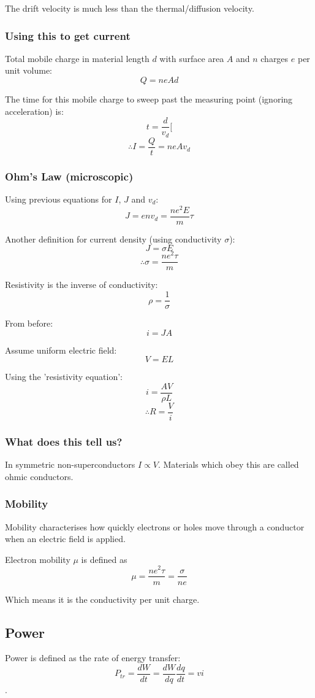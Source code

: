 \documentclass[11pt,a4paper]{report}
\begin{document}
The drift velocity is much less than the thermal/diffusion velocity. 

\subsubsection{Using this to get current}
Total mobile charge in material length $d$ with surface area $A$ and $n$ charges $e$ per unit volume:
\[Q=neAd\]

The time for this mobile charge to sweep past the measuring point (ignoring acceleration) is:
\[t=\frac{d}{v_d}[\]
\[\therefore I = \frac{Q}{t} = neAv_d\]

\subsubsection{Ohm's Law (microscopic)}
Using previous equations for $I$, $J$ and $v_d$:
\[J = env_d=\frac{ne^2E}{m}\tau\]

Another definition for current density (using conductivity $\sigma$):
\[J=\sigma E\]
\[\therefore \sigma = \frac{ne^2\tau}{m}\]

Resistivity is the inverse of conductivity:
\[\rho = \frac{1}{\sigma}\]

From before:
\[i=JA\]

Assume uniform electric field:
\[V=EL\]

Using the 'resistivity equation':
\[i=\frac{AV}{\rho L}\]
\[\therefore R=\frac{V}{i}\]

\subsubsection{What does this tell us?}
In symmetric non-superconductors  $I \propto V$. Materials which obey this are called ohmic conductors.

\subsubsection{Mobility}
Mobility characterises how quickly electrons or holes move through a conductor when an electric field is applied. 

Electron mobility $\mu$ is defined as
\[\mu = \frac{ne^2\tau}{m} = \frac{\sigma}{ne}\]

Which means it is the conductivity per unit charge.

\subsection{Power}
Power is defined as the rate of energy transfer:
\[P_{tr} = \frac{dW}{dt} = \frac{dW}{dq}\frac{dq}{dt} = vi\].
\end{document}

